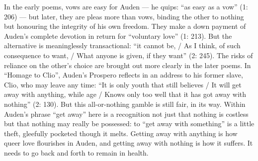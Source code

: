 \documentclass{article}
\begin{document}
In the early poems, vows are easy for Auden –– he quips: ``as easy as a
vow'' (1: 206) –– but later, they are pleas more than vows, binding the
other to nothing but honouring the integrity of his own freedom. They
make a down payment of Auden's complete devotion in return for
``voluntary love'' (1: 213). But the alternative is meaninglessly transactional:
``it cannot be, / As I think, of such consequence to want, / What anyone
is given, if they want'' (2: 245). The risks of reliance on the other's choice are brought out more clearly in the later poems. In ``Homage to Clio'', Auden's
Prospero reflects in an address to his former slave, Clio, who may leave
any time: ``It is only youth that still believes / It will get away with
anything, while age / Knows only too well that it has got away with
nothing'' (2: 130). But this all-or-nothing gamble is still fair, in its way. Within Auden's phrase ``get away'' here is a recognition
not just that nothing is costless but that nothing may really be
possessed: to ``get away with something'' is a little theft, gleefully
pocketed though it melts. Getting away with anything is how queer love
flourishes in Auden, and getting away with nothing is how it suffers. It
needs to go back and forth to remain in health.


\begin{flushleft}
    \renewcommand*{\mkbibnamefamily}[1]{\textsc{#1}}
    \renewcommand*{\mkbibnamegiven}[1]{\textsc{#1}} 
\printbibliography
\end{flushleft}
\end{document}
